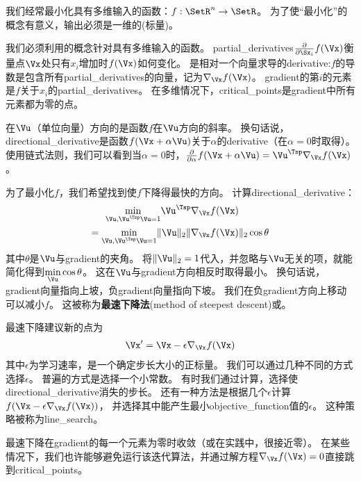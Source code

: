 我们经常最小化具有多维输入的函数：$f: \SetR^n \rightarrow \SetR $。 
为了使``最小化''的概念有意义，输出必须是一维的(标量)。


我们必须利用的概念针对具有多维输入的函数。
\gls{partial_derivatives}$\frac{\partial}{\partial \Sx_i}f(\Vx)$衡量点$\Vx$处只有$x_i$增加时$f(\Vx)$如何变化。
是相对一个向量求导的\gls{derivative}:$f$的导数是包含所有\gls{partial_derivatives}的向量，记为$\nabla_{\Vx} f(\Vx)$。
\gls{gradient}的第$i$的元素是$f$关于$x_i$的\gls{partial_derivatives}。
在多维情况下，\gls{critical_points}是\gls{gradient}中所有元素都为零的点。

在$\Vu$（单位向量）方向的是函数$f$在$\Vu$方向的斜率。
换句话说，\gls{directional_derivative}是函数$f(\Vx + \alpha \Vu)$关于$\alpha$的\gls{derivative}（在$\alpha = 0$时取得）。
使用链式法则，我们可以看到当$\alpha=0$时，$\frac{\partial}{\partial \alpha} f(\Vx + \alpha \Vu) = \Vu^\Tsp \nabla_{\Vx} f(\Vx)$。

为了最小化$f$，我们希望找到使$f$下降得最快的方向。
计算\gls{directional_derivative}：
\begin{align}
 \underset{\Vu, \Vu^\Tsp\Vu = 1}{\min} \Vu^\Tsp & \nabla_{\Vx} f(\Vx) \\
 = \underset{\Vu, \Vu^\Tsp\Vu = 1}{\min} \| \Vu \|_2 \| &\nabla_{\Vx}f(\Vx) \|_2 \cos \theta
\end{align}
其中$\theta$是$\Vu$与\gls{gradient}的夹角。
将$ \| \Vu \|_2 = 1$代入，并忽略与$\Vu$无关的项，就能简化得到$ \underset{\Vu}{\min} \cos \theta $。 
这在$\Vu$与\gls{gradient}方向相反时取得最小。
换句话说，\gls{gradient}向量指向上坡，负\gls{gradient}向量指向下坡。
我们在负\gls{gradient}方向上移动可以减小$f$。
这被称为\textbf{最速下降法}(method of steepest descent)或。

最速下降建议新的点为
\begin{align}
  \Vx' = \Vx - \epsilon \nabla_{\Vx} f(\Vx)
\end{align}
其中$\epsilon$为学习速率，是一个确定步长大小的正标量。
我们可以通过几种不同的方式选择$\epsilon$。
普遍的方式是选择一个小常数。
有时我们通过计算，选择使\gls{directional_derivative}消失的步长。
还有一种方法是根据几个$\epsilon$计算$f(\Vx - \epsilon \nabla_{\Vx} f(\Vx))$， 并选择其中能产生最小\gls{objective_function}值的$\epsilon$。
这种策略被称为\gls{line_search}。

最速下降在\gls{gradient}的每一个元素为零时收敛（或在实践中，很接近零）。
在某些情况下，我们也许能够避免运行该迭代算法，并通过解方程$\nabla_{\Vx} f(\Vx)= 0$直接跳到\gls{critical_points}。

